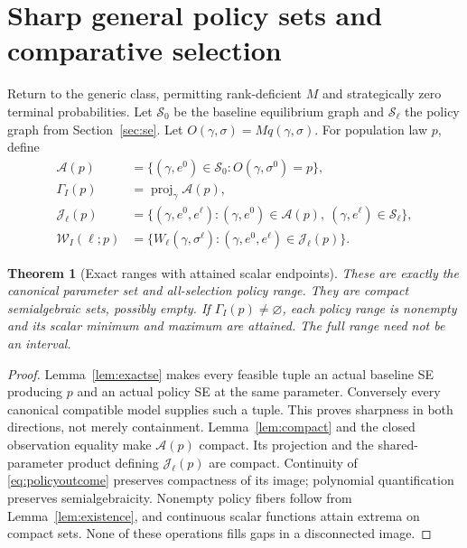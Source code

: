 \documentclass[11pt,a4paper]{article}
\numberwithin{equation}{section}
\newtheorem{theorem}{Theorem}
\theoremstyle{definition}
\begin{document}
\section{Sharp general policy sets and comparative selection}
\label{sec:policysets}
Return to the generic class, permitting rank-deficient \(M\) and
strategically zero terminal probabilities. Let \(\mathcal S_0\)
be the baseline equilibrium graph and \(\mathcal S_\ell\) the
policy graph from Section~\ref{sec:se}. Let
\(O(\gamma,\sigma)=Mq(\gamma,\sigma)\). For population law \(p\), define
\begin{equation}\label{eq:policysets}
 \begin{aligned}
 \mathcal A(p)&=\{(\gamma,e^0)\in\mathcal S_0:
                         O(\gamma,\sigma^0)=p\},\\
 \Gamma_I(p)&=\operatorname{proj}_\gamma\mathcal A(p),\\
 \mathcal J_\ell(p)&=\{(\gamma,e^0,e^\ell):
        (\gamma,e^0)\in\mathcal A(p),\
        (\gamma,e^\ell)\in\mathcal S_\ell\},\\
 \mathcal W_I(\ell;p)&=
   \{W_\ell(\gamma,\sigma^\ell):
                       (\gamma,e^0,e^\ell)\in\mathcal J_\ell(p)\}.
 \end{aligned}
\end{equation}

\begin{theorem}[Exact ranges with attained scalar endpoints]
\label{thm:generalsets}
These are exactly the canonical parameter set and all-selection
policy range. They are compact semialgebraic sets, possibly empty.
If \(\Gamma_I(p)\ne\varnothing\), each policy range is nonempty and
its scalar minimum and maximum are attained.
The full range need not be an interval.
\end{theorem}
\begin{proof}
Lemma~\ref{lem:exactse} makes every feasible tuple an actual baseline
SE producing \(p\) and an actual policy SE at the same parameter.
Conversely every canonical compatible model supplies such a tuple.
This proves sharpness in both directions, not merely containment.
Lemma~\ref{lem:compact} and the closed observation equality make
\(\mathcal A(p)\) compact. Its projection and the shared-parameter
product defining \(\mathcal J_\ell(p)\) are compact.
Continuity of \eqref{eq:policyoutcome} preserves compactness of
its image; polynomial quantification preserves semialgebraicity.
Nonempty policy fibers follow from Lemma~\ref{lem:existence},
and continuous scalar functions attain extrema on compact sets.
None of these operations fills gaps in a disconnected image.
\end{proof}
\end{document}
